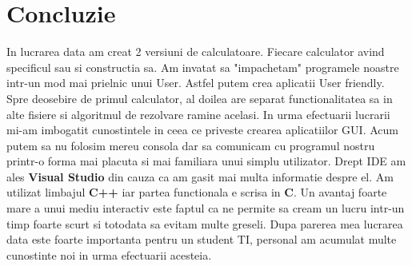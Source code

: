 \documentclass[12pt]{article}
\newcommand \tab[1][1cm]{\hspace*{#1}}
\begin{document}

\cleardoublepage


\cleardoublepage


\cleardoublepage
\section*{Concluzie}

\tab In lucrarea data am creat 2 versiuni de calculatoare. Fiecare calculator
avind specificul sau si constructia sa. Am invatat sa "impachetam" programele
noastre intr-un mod mai prielnic unui User. Astfel putem crea aplicatii User
friendly. Spre deosebire de primul calculator, al doilea are separat
functionalitatea sa in alte fisiere si algoritmul de rezolvare ramine acelasi.
In urma efectuarii lucrarii mi-am imbogatit cunostintele in ceea ce priveste crearea aplicatiilor GUI. Acum putem sa nu folosim mereu consola dar sa comunicam
cu programul nostru printr-o forma mai placuta si mai familiara unui simplu
utilizator. Drept IDE am ales \textbf{Visual Studio} din cauza ca am gasit mai multa
informatie despre el. Am utilizat limbajul \textbf{C++} iar partea functionala
e scrisa in \textbf{C}. Un avantaj foarte mare a unui mediu interactiv este
faptul ca ne permite sa cream un lucru intr-un timp foarte scurt si totodata
sa evitam multe greseli. Dupa parerea mea lucrarea data este foarte importanta
pentru un student TI, personal am acumulat multe cunostinte noi in urma
efectuarii acesteia.
\end{document}
